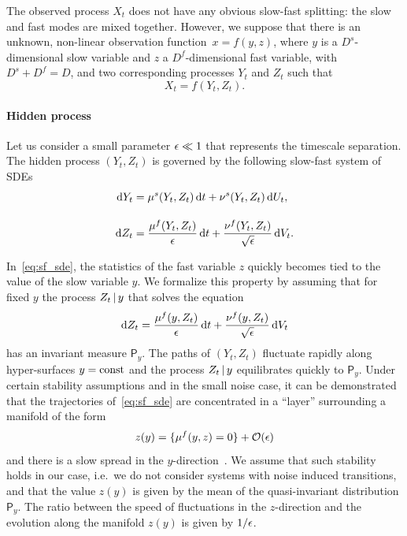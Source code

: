 \documentclass{article}
\newcommand{\invm}{\mathsf{P}} %
\begin{document}
The observed process $X_t$ does not have any obvious slow-fast splitting: the slow and fast modes are mixed together.
However, we suppose that there is an unknown, non-linear observation function~$x=f(y,z)$, where $y$ is a $D^s$-dimensional slow variable and $z$ a $D^f$-dimensional fast variable, with $D^s+D^f=D$, and two corresponding processes $Y_t$ and $Z_t$ such that
\begin{equation}
    X_t = f(Y_t, Z_t).
\end{equation}

\paragraph{Hidden process}
Let us consider a small parameter $\epsilon\ll1$ that represents the timescale separation. The hidden process $(Y_t,Z_t)$ is governed by the following slow-fast system of SDEs
\begin{gather}\label{eq:sf_sde}
    \begin{aligned}
        \operatorname{d}\!{Y_t} &= \mu^s(Y_t, Z_t)\operatorname{d}\!{t} + \nu^s(Y_t, Z_t)\operatorname{d}\!{U_t},\\[1em]
        \operatorname{d}\!{Z_t} &= \frac{\mu^f(Y_t, Z_t)}{\epsilon}\operatorname{d}\!{t} + \frac{\nu^f(Y_t, Z_t)}{\sqrt{\epsilon}}\operatorname{d}\!{V_t}.
    \end{aligned}
\end{gather}

In~\eqref{eq:sf_sde}, the statistics of the fast variable $z$ quickly becomes tied to the value of the slow variable $y$. We formalize this property by assuming that for fixed $y$ the process $Z_t\operatorname{|} y$ that solves the equation
\begin{equation*}
    \operatorname{d}\!{Z_t} = \frac{\mu^f(y, Z_t)}{\epsilon}\operatorname{d}\!{t} + \frac{\nu^f(y, Z_t)}{\sqrt{\epsilon}}\operatorname{d}\!{V_t}
\end{equation*}
has an invariant measure $\invm_{\!y}$. The paths of $(Y_t,Z_t)$ fluctuate rapidly along hyper-surfaces $y=\mathrm{const}$ and the process $Z_t\operatorname{|} y$ equilibrates quickly to $\invm_{\!y}$. Under certain stability assumptions and in the small noise case, it can be demonstrated that the trajectories of~\eqref{eq:sf_sde} are concentrated in a ``layer'' surrounding a manifold of the form
\begin{equation*}
    z(y) = \{\mu^f(y,z) = 0\} +\mathcal{O}(\epsilon)
\end{equation*}
and there is a slow spread in the $y$-direction~\cite{berglund_geometric_2003}. We assume that such stability holds in our case, i.e.~we do not consider systems with noise induced transitions, and that the value $z(y)$ is given by the mean of the quasi-invariant distribution $\invm_{\!y}$. The ratio between the speed of fluctuations in the $z$-direction and the evolution along the manifold $z(y)$ is given by $1/\epsilon$.
\end{document}
